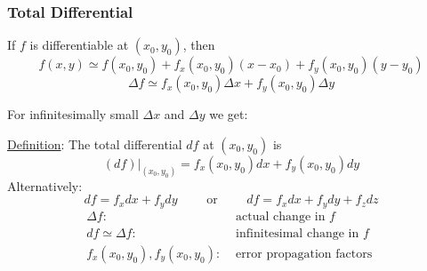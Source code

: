
\begin{frame}
  \frametitle{Total Differential}

If $f$ is differentiable at $(x_0,y_0)$, then
%
$$f(x,y) \simeq f(x_0,y_0)+ f_x(x_0,y_0)(x-x_0) + f_y(x_0,y_0) (y-y_0)$$
%
$$\Delta f \simeq f_x(x_0,y_0) \Delta x + f_y(x_0,y_0) \Delta y$$

\pause For infinitesimally small $\Delta x$ and $\Delta y$ we get:

\underline{Definition}: The \textcolor[rgb]{0.98,0.00,0.00}{total differential} $df$ at $(x_0,y_0)$ is
%
$$\left. (df) \right|_{(x_0,y_0)} = f_x(x_0,y_0) dx + f_y(x_0,y_0) dy$$
%
\pause Alternatively:
%
$$df = f_x dx + f_y dy \qquad \text{ or } \qquad  df = f_x dx + f_y dy + f_z dz$$
%
\begin{align*}
  \Delta f: & \text{ actual change in } f\\
  df \simeq \Delta f: & \text{ infinitesimal change in } f\\
  f_x(x_0,y_0), f_y(x_0,y_0): & \text{ error propagation factors }
\end{align*}

\end{frame}